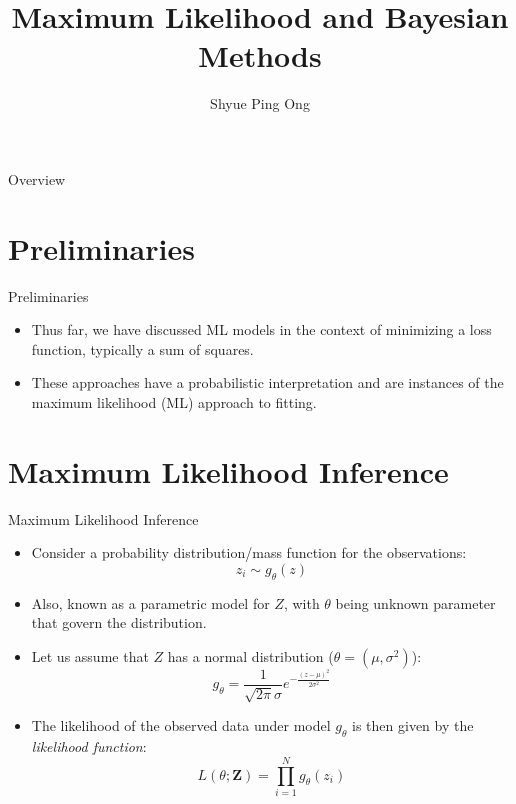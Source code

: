 \documentclass[aspectratio=169]{beamer}
\title[Maximum Likelihood and Bayesian Methods]{Maximum Likelihood and Bayesian Methods}
\author{Shyue Ping Ong}
\institute[UCSD]{University of California, San Diego\\
\medskip
}
\date{} %
\let \vec \mathbf
\begin{document}
\begin{frame}
    \titlepage %
\end{frame}


\begin{frame}{Overview}
    \tableofcontents
\end{frame}


\section{Preliminaries}

\begin{frame}{Preliminaries}
    \begin{itemize}
        \item Thus far, we have discussed ML models in the context of minimizing a loss function, typically a sum of squares.
        \item These approaches have a probabilistic interpretation and are instances of the maximum likelihood (ML) approach to fitting.
    \end{itemize}
\end{frame}

\section{Maximum Likelihood Inference}


\begin{frame}{Maximum Likelihood Inference}
    \begin{itemize}
        \item Consider a probability distribution/mass function for the observations:
        \begin{equation*}
            z_i \sim g_{\theta}(z)
        \end{equation*}
        \item Also, known as a parametric model for $Z$, with $\theta$ being unknown parameter that govern the distribution.
        \item Let us assume that $Z$ has a normal distribution ($\theta = (\mu, \sigma^2)$):
        \begin{equation*}
            g_{\theta} = \frac{1}{\sqrt{2\pi}\sigma} e^{-\frac{(z-\mu)^2}{2\sigma^2}}
        \end{equation*}
        \item The likelihood of the observed data under model $g_{\theta}$ is then given by the \textit{likelihood function}:
        \begin{equation*}
            L(\theta; \vec{Z}) = \prod_{i=1}^N g_{\theta}(z_i)
        \end{equation*}
    \end{itemize}
\end{frame}
\end{document}
